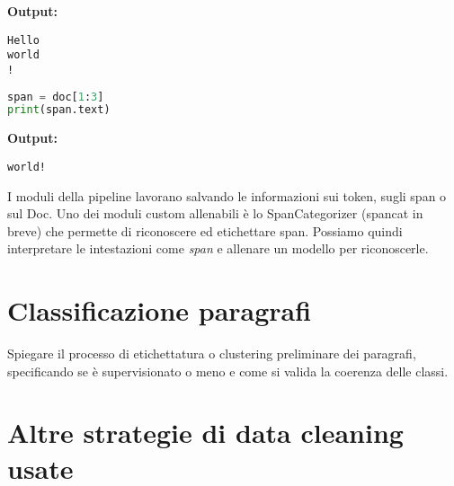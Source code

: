 \noindent \textbf{Output:}

\begin{lstlisting}[style=output]
Hello
world
!
\end{lstlisting}

\begin{lstlisting}[language=python,style=python]
span = doc[1:3]
print(span.text)
\end{lstlisting}

\noindent \textbf{Output:}

\begin{lstlisting}[style=output]
world!
\end{lstlisting}

\noindent I moduli della pipeline lavorano salvando le informazioni sui token, sugli span o sul Doc. Uno dei moduli custom allenabili è lo SpanCategorizer (spancat in breve) che permette di riconoscere ed etichettare span. Possiamo quindi interpretare le intestazioni come \textit{span} e allenare un modello per riconoscerle.


\section{Classificazione paragrafi}
Spiegare il processo di etichettatura o clustering preliminare dei paragrafi, specificando se è supervisionato o meno e come si valida la coerenza delle classi.

\section{ Altre strategie di data cleaning usate}
